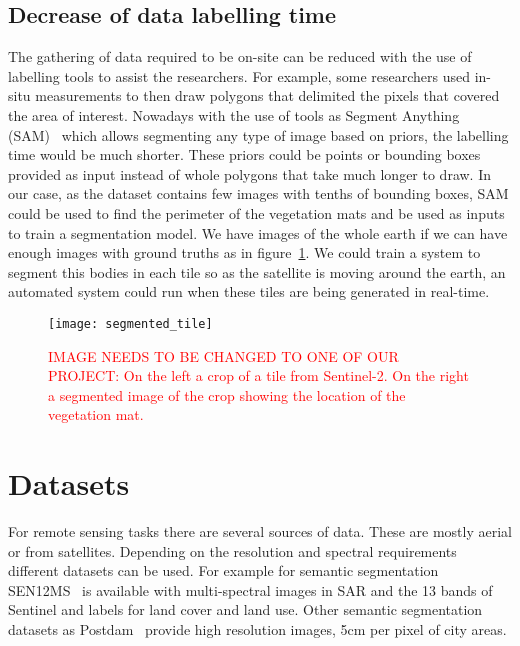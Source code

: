 \documentclass[conference]{IEEEtran}
\begin{document}
    \subsection*{Decrease of data labelling time}

    The gathering of data required to be on-site can be reduced with the use of labelling tools to assist the researchers.
    For example, some researchers used in-situ measurements to then draw polygons that delimited the pixels that covered the area of interest.
    Nowadays with the use of tools as Segment Anything (SAM)~\cite{kirillov2023segment} which allows segmenting any type of image based on priors, the labelling time would be much shorter.
    These priors could be points or bounding boxes provided as input instead of whole polygons that take much longer to draw.
    In our case, as the dataset contains few images with tenths of bounding boxes, SAM could be used to find the perimeter
    of the vegetation mats and be used as inputs to train a segmentation model.
    We have images of the whole earth if we can have enough images with ground truths as in figure~\ref{fig:tile-segmented}.
    We could train a system to segment this bodies in each tile so as the satellite is moving around the earth, an automated system could run when these tiles are being generated in real-time.

    \begin{figure}[h]
        \centering
        \texttt{[image: segmented\_tile]}
        \caption{\textcolor{red}{IMAGE NEEDS TO BE CHANGED TO ONE OF OUR PROJECT:
        On the left a crop of a tile from Sentinel-2. On the right a segmented image of the crop showing the
        location of the vegetation mat.}}
        \label{fig:tile-segmented}
    \end{figure}


    \section{Datasets}\label{sec:dataset}
    For remote sensing tasks there are several sources of data.
    These are mostly aerial or from satellites.
    Depending on the resolution and spectral requirements different datasets can be used.
    For example for semantic segmentation SEN12MS~\cite{SEN12MS_dataset} is available with multi-spectral images
    in SAR and the 13 bands of Sentinel and labels for land cover and land use.
    Other semantic segmentation datasets as Postdam~\cite{postdam_dataset} provide high resolution images, 5cm per pixel of
    city areas.
\end{document}

